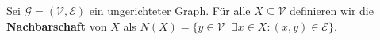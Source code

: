 \begin{definition}[Nachbarschaft]\label{def:nachbarschaft}
Sei $\mathcal{G} = (\mathcal{V}, \mathcal{E})$ ein ungerichteter Graph.
Für alle $X \subseteq \mathcal{V}$ definieren wir die \textbf{Nachbarschaft}
von $X$ als $N(X) = \{y \in \mathcal{V} \,|\, \exists x \in X : (x, y) \in \mathcal{E}\}$.\textnormal{\cite[S.~735, Übung]{cormen:matchings}}
\end{definition}
